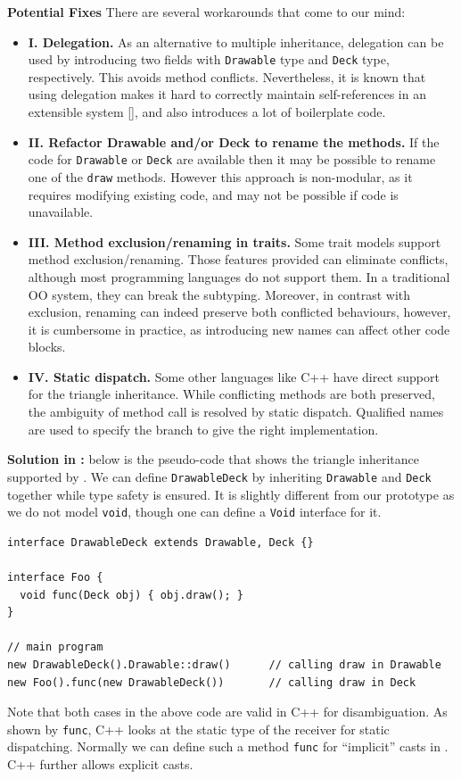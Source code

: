 \noindent\textbf{Potential Fixes} There are several workarounds that come to our mind:
\begin{itemize}
  \item \textbf{I. Delegation.} As an alternative to multiple inheritance,
  delegation can be used by introducing two fields with
  \lstinline|Drawable| type and \lstinline|Deck| type,
  respectively. This avoids method conflicts. Nevertheless, it is known
  that using delegation makes it hard to correctly maintain
  self-references  in an extensible system [], and also
  introduces a lot of boilerplate code.
  \item \textbf{II. Refactor Drawable and/or Deck to rename the methods.} If
  the code for \lstinline|Drawable| or \lstinline|Deck| are available
  then it may be possible to rename one of the \lstinline|draw|
  methods. However this approach is non-modular, as it requires 
  modifying existing code, and may not be possible if code is unavailable.
  \item \textbf{III. Method exclusion/renaming in traits.} Some trait models
  support method exclusion/renaming. Those features
  provided can eliminate conflicts, although most
  programming languages do not support them. In a traditional OO system,
  they can break the subtyping. Moreover, in
  contrast with exclusion, renaming can indeed preserve both conflicted
  behaviours, however, it is cumbersome in practice, as introducing new
  names can affect other code blocks.
  \item \textbf{IV. Static dispatch.} Some other languages like C++ have
  direct support for the triangle inheritance. While conflicting methods are
  both preserved, the ambiguity of method call is resolved by static dispatch.
  Qualified names are used to specify the branch to give the right implementation.
\end{itemize}

\noindent\textbf{Solution in \name{}:} below is the pseudo-code that shows the triangle
inheritance supported by \name{}.
We can define \lstinline|DrawableDeck| by inheriting \lstinline|Drawable| and \lstinline|Deck| together while
type safety is ensured. It is slightly different from our prototype as we do not model \lstinline|void|, though one can
define a \lstinline|Void| interface for it.
\vspace{3pt}\begin{lstlisting}
interface DrawableDeck extends Drawable, Deck {}

interface Foo {
  void func(Deck obj) { obj.draw(); }
}

// main program
new DrawableDeck().Drawable::draw()      // calling draw in Drawable
new Foo().func(new DrawableDeck())       // calling draw in Deck
\end{lstlisting}\vspace{3pt}
Note that both cases in the above code are valid in C++ for disambiguation. As shown by \lstinline|func|, C++ looks at
the static type of the receiver for static dispatching. Normally we can define such a method \lstinline|func| for ``implicit''
casts in \name{}. C++ further allows explicit casts.

